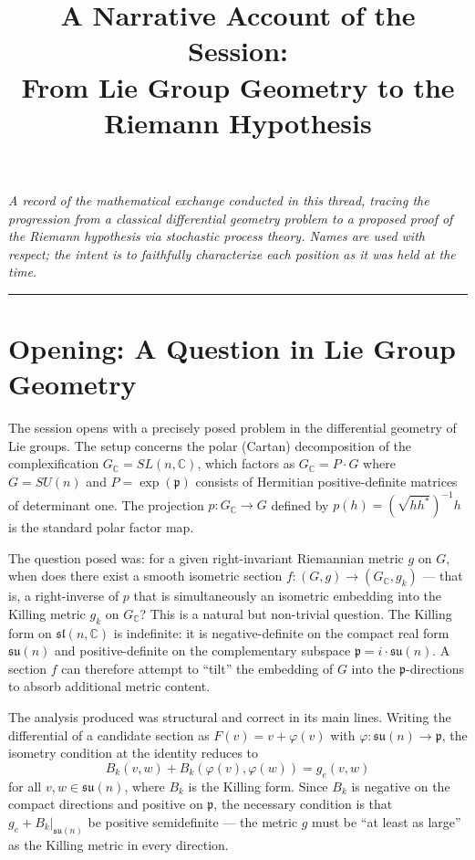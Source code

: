 \documentclass[12pt]{article}
\title{A Narrative Account of the Session:\\
From Lie Group Geometry to the Riemann Hypothesis}
\author{}
\date{}
\begin{document}
\maketitle

\noindent\textit{A record of the mathematical exchange conducted in this thread, tracing the
progression from a classical differential geometry problem to a proposed proof of
the Riemann hypothesis via stochastic process theory. Names are used with respect;
the intent is to faithfully characterize each position as it was held at the time.}

\bigskip
\hrule
\bigskip

\section{Opening: A Question in Lie Group Geometry}

The session opens with a precisely posed problem in the differential geometry of Lie
groups. The setup concerns the polar (Cartan) decomposition of the complexification
$G_{\mathbb{C}} = SL(n,\mathbb{C})$, which factors as $G_{\mathbb{C}} = P \cdot G$
where $G = SU(n)$ and $P = \exp(\mathfrak{p})$ consists of Hermitian positive-definite
matrices of determinant one. The projection $p: G_{\mathbb{C}} \to G$ defined by
$p(h) = (\sqrt{hh^*})^{-1} h$ is the standard polar factor map.

The question posed was: for a given right-invariant Riemannian metric $g$ on $G$,
when does there exist a smooth isometric section $f: (G,g) \to (G_{\mathbb{C}}, g_k)$
--- that is, a right-inverse of $p$ that is simultaneously an isometric embedding into
the Killing metric $g_k$ on $G_{\mathbb{C}}$? This is a natural but non-trivial
question. The Killing form on $\mathfrak{sl}(n,\mathbb{C})$ is indefinite: it is
negative-definite on the compact real form $\mathfrak{su}(n)$ and positive-definite on
the complementary subspace $\mathfrak{p} = i \cdot \mathfrak{su}(n)$. A section $f$
can therefore attempt to ``tilt'' the embedding of $G$ into the $\mathfrak{p}$-directions
to absorb additional metric content.

The analysis produced was structural and correct in its main lines. Writing the
differential of a candidate section as $F(v) = v + \varphi(v)$ with
$\varphi: \mathfrak{su}(n) \to \mathfrak{p}$, the isometry condition at the identity
reduces to
\[
    B_k(v,w) + B_k(\varphi(v), \varphi(w)) = g_e(v,w)
\]
for all $v, w \in \mathfrak{su}(n)$, where $B_k$ is the Killing form. Since $B_k$ is
negative on the compact directions and positive on $\mathfrak{p}$, the necessary
condition is that $g_e + B_k|_{\mathfrak{su}(n)}$ be positive semidefinite --- the
metric $g$ must be ``at least as large'' as the Killing metric in every direction.
\end{document}
